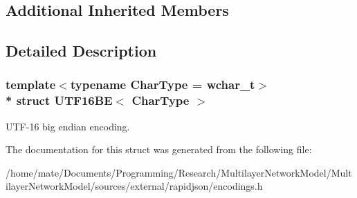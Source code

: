 \subsection*{Additional Inherited Members}


\subsection{Detailed Description}
\subsubsection*{template$<$typename Char\+Type = wchar\+\_\+t$>$\\*
struct U\+T\+F16\+B\+E$<$ Char\+Type $>$}

U\+T\+F-\/16 big endian encoding. 

The documentation for this struct was generated from the following file\+:\begin{DoxyCompactItemize}
\item 
/home/mate/\+Documents/\+Programming/\+Research/\+Multilayer\+Network\+Model/\+Multilayer\+Network\+Model/sources/external/rapidjson/encodings.\+h\end{DoxyCompactItemize}
